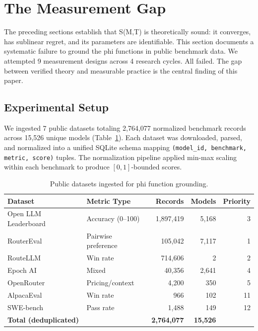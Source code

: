 \section{The Measurement Gap}
\label{sec:measurement}

The preceding sections establish that S(M,T) is theoretically sound: it converges, has sublinear regret, and its parameters are identifiable. This section documents a systematic failure to ground the phi functions in public benchmark data. We attempted 9 measurement designs across 4 research cycles. All failed. The gap between verified theory and measurable practice is the central finding of this paper.

\subsection{Experimental Setup}

We ingested 7 public datasets totaling 2,764,077 normalized benchmark records across 15,526 unique models (Table~\ref{tab:datasets}). Each dataset was downloaded, parsed, and normalized into a unified SQLite schema mapping \texttt{(model\_id, benchmark, metric, score)} tuples. The normalization pipeline applied min-max scaling within each benchmark to produce $[0,1]$-bounded scores.

\begin{table}[h]
\centering
\caption{Public datasets ingested for phi function grounding.}
\label{tab:datasets}
\small
\begin{tabular}{llrrr}
\toprule
\textbf{Dataset} & \textbf{Metric Type} & \textbf{Records} & \textbf{Models} & \textbf{Priority} \\
\midrule
Open LLM Leaderboard & Accuracy (0--100) & 1,897,419 & 5,168 & 3 \\
RouterEval & Pairwise preference & 105,042 & 7,117 & 1 \\
RouteLLM & Win rate & 714,606 & 2 & 2 \\
Epoch AI & Mixed & 40,356 & 2,641 & 4 \\
OpenRouter & Pricing/context & 4,200 & 350 & 5 \\
AlpacaEval & Win rate & 966 & 102 & 11 \\
SWE-bench & Pass rate & 1,488 & 149 & 12 \\
\midrule
\multicolumn{2}{l}{\textbf{Total (deduplicated)}} & \textbf{2,764,077} & \textbf{15,526} & \\
\bottomrule
\end{tabular}
\end{table}

